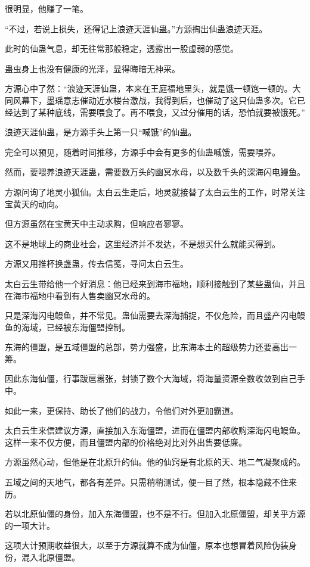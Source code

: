 \begin{this_body}
很明显，他赚了一笔。

“不过，若说上损失，还得记上浪迹天涯仙蛊。”方源掏出仙蛊浪迹天涯。

此时的仙蛊气息，却无往常那般稳定，透露出一股虚弱的感觉。

蛊虫身上也没有健康的光泽，显得晦暗无神采。

方源心中了然：“浪迹天涯仙蛊，本来在王庭福地里头，就是饿一顿饱一顿的。大同风幕下，墨瑶意志催动近水楼台激战，我得到后，也催动了这只仙蛊多次。它已经达到了某种底线，需要喂食了。再不喂食，又过分催用的话，恐怕就要被饿死。”

浪迹天涯仙蛊，是方源手头上第一只“喊饿”的仙蛊。

完全可以预见，随着时间推移，方源手中会有更多的仙蛊喊饿，需要喂养。

然而，要喂养浪迹天涯蛊，需要数万头的幽冥水母，以及数千头的深海闪电鳗鱼。

方源问询了地灵小狐仙。太白云生走后，地灵就接替了太白云生的工作，时常关注宝黄天的动向。

但方源虽然在宝黄天中主动求购，但响应者寥寥。

这不是地球上的商业社会，这里经济并不发达，不是想买什么就能买得到。

方源又用推杯换盏蛊，传去信笺，寻问太白云生。

太白云生带给他一个好消息：他已经来到海市福地，顺利接触到了某些蛊仙，并且在海市福地中看到有人售卖幽冥水母的。

只是深海闪电鳗鱼，并不常见。蛊仙需要去深海捕捉，不仅危险，而且盛产闪电鳗鱼的海域，已经被东海僵盟控制。

东海的僵盟，是五域僵盟的总部，势力强盛，比东海本土的超级势力还要高出一筹。

因此东海仙僵，行事跋扈嚣张，封锁了数个大海域，将海量资源全数收敛到自己手中。

如此一来，更保持、助长了他们的战力，令他们对外更加霸道。

太白云生来信建议方源，直接加入东海僵盟，进而在僵盟内部收购深海闪电鳗鱼。这样一来不仅方便，而且僵盟内部的价格绝对比对外出售要低廉。

方源虽然心动，但他是在北原升的仙。他的仙窍是有北原的天、地二气凝聚成的。

五域之间的天地气，都各有差异。只需稍稍测试，便一目了然，根本隐藏不住来历。

若以北原仙僵的身份，加入东海僵盟，也不是不行。但加入北原僵盟，却关乎方源的一项大计。

这项大计预期收益很大，以至于方源就算不成为仙僵，原本也想冒着风险伪装身份，混入北原僵盟。


\end{this_body}
